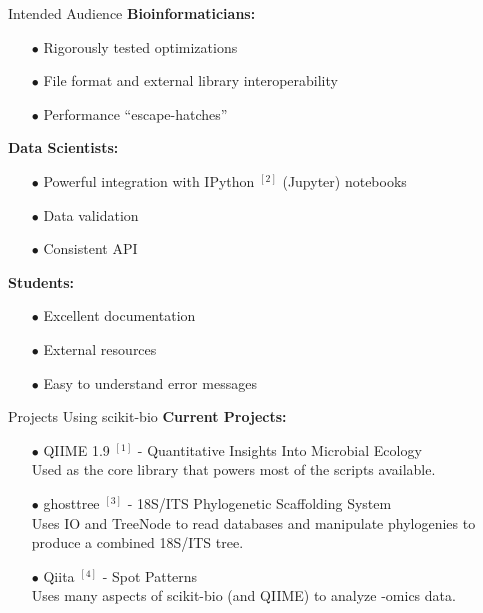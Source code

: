 \documentclass[final,t]{beamer}
\begin{document}
\begin{frame}{}
\begin{columns}[t]
\begin{column}{.3\linewidth}
        \begin{block}{Intended Audience}
            \textbf{Bioinformaticians:}
            \begin{itemize}
                \item[$\bullet$] Rigorously tested optimizations
                \item[$\bullet$] File format and external library interoperability
                \item[$\bullet$] Performance ``escape-hatches''
                \newline
            \end{itemize}
            \textbf{Data Scientists:}
            \begin{itemize}
                \item[$\bullet$] Powerful integration with IPython $^{[2]}$ (Jupyter) notebooks
                \item[$\bullet$] Data validation
                \item[$\bullet$] Consistent API
                \newline
            \end{itemize}
            \textbf{Students:}
            \begin{itemize}
                \item[$\bullet$] Excellent documentation
                \item[$\bullet$] External resources
                \item[$\bullet$] Easy to understand error messages
                \newline
            \end{itemize}
        \end{block}


        \begin{block}{Projects Using scikit-bio}
            \textbf{Current Projects:} \\
            \begin{itemize}
              \item[$\bullet$] QIIME 1.9 $^{[1]}$ - Quantitative Insights Into Microbial Ecology \hfill \\
              Used as the core library that powers most of the scripts available.
              \newline
              \item[$\bullet$] ghosttree $^{[3]}$ - 18S/ITS Phylogenetic Scaffolding System \hfill \\
              Uses IO and TreeNode to read databases and manipulate phylogenies to produce a combined 18S/ITS tree.
              \newline
              \item[$\bullet$] Qiita $^{[4]}$ - Spot Patterns \hfill \\
              Uses many aspects of scikit-bio (and QIIME) to analyze -omics data.
              \newline


\end{itemize}
\end{block}
\end{column}
\end{columns}
\end{frame}
\end{document}
